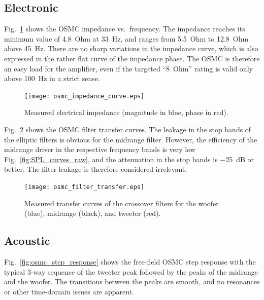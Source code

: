 \documentclass[12pt,a4paper]{article}
\providecommand{\figr}[1]{Fig.~\ref{fig:#1}}
\providecommand{\figlabel}[1]{\label{fig:#1}}
\begin{document}
\subsection{Electronic}
\figr{osmc_impedance_curve} shows the OSMC impedance vs.\ frequency. The impedance reaches its minimum value of \SI{4.8}{Ohm} at \SI{33}{Hz}, and ranges from \SI{5.5}{Ohm} to \SI{12.8}{Ohm} above \SI{45}{Hz}. There are no sharp variations in the impedance curve, which is also expressed in the rather flat curve of the impedance phase. The OSMC is therefore an easy load for the amplifier, even if the targeted ``\SI{8}{Ohm}'' rating\cite{osmc_p904} is valid only above \SI{100}{Hz} in a strict sense.

\begin{figure}[tbp]
	\centering
	\texttt{[image: osmc\_impedance\_curve.eps]}
	\caption{Measured electrical impedance (magnitude in blue, phase in red).}
	\figlabel{osmc_impedance_curve}
\end{figure}

\figr{osmc_filter_transfer} shows the OSMC filter transfer curves. The leakage in the stop bands of the elliptic filters is obvious for the midrange filter. However, the efficiency of the midrange driver in the respective frequency bands is very low \figr{SPL_curves_raw}, and the attenuation in the stop bands is \SI{-25}{dB} or better. The filter leakage is therefore considered irrelevant.

\begin{figure}[tpb]
	\centering
	\texttt{[image: osmc\_filter\_transfer.eps]}
	\caption{Measured transfer curves of the crossover filters for the woofer (blue), midrange (black), and tweeter (red).}
	\figlabel{osmc_filter_transfer}
\end{figure}


\subsection{Acoustic}
\figr{osmc_step_response} shows the free-field OSMC step response with the typical 3-way sequence of the tweeter peak followed by the peaks of the midrange and the woofer. The transitions between the peaks are smooth, and no resonances or other time-domain issues are apparent.
\end{document}
